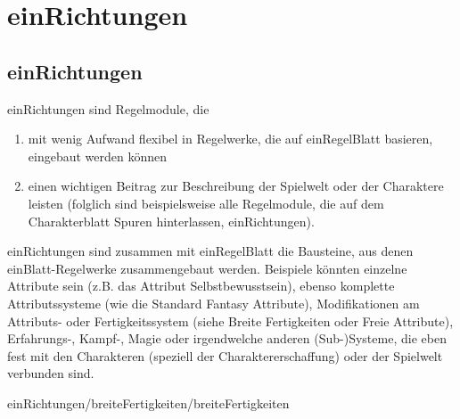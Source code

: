 \part {einRichtungen}
\chapter {einRichtungen}
einRichtungen sind Regelmodule, die
\begin{enumerate}
\item mit wenig Aufwand flexibel in Regelwerke, die auf einRegelBlatt basieren, eingebaut werden können
\item einen wichtigen Beitrag zur Beschreibung der Spielwelt oder der Charaktere leisten (folglich sind beispielsweise alle Regelmodule, die auf dem Charakterblatt Spuren hinterlassen, einRichtungen).
\end{enumerate}
einRichtungen sind zusammen mit einRegelBlatt die Bausteine, aus denen einBlatt-Regelwerke zusammengebaut werden.
Beispiele könnten einzelne Attribute sein (z.B. das Attribut Selbstbewusstsein), ebenso komplette Attributssysteme (wie die Standard Fantasy Attribute), Modifikationen am Attributs- oder Fertigkeitssystem (siehe Breite Fertigkeiten oder Freie Attribute), Erfahrungs-, Kampf-, Magie oder irgendwelche anderen (Sub-)Systeme, die eben fest mit den Charakteren (speziell der Charaktererschaffung) oder der Spielwelt verbunden sind.

 {einRichtungen/breiteFertigkeiten/breiteFertigkeiten}
